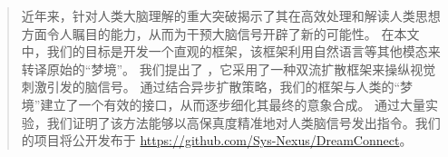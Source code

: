 \begin{abstract}

近年来，针对人类大脑理解的重大突破揭示了其在高效处理和解读人类思想方面令人瞩目的能力，从而为干预大脑信号开辟了新的可能性。
在本文中，我们的目标是开发一个直观的框架，该框架利用自然语言等其他模态来转译原始的“梦境”。
我们提出了 \textbf{\model{}}，它采用了一种双流扩散框架来操纵视觉刺激引发的脑信号。
通过结合异步扩散策略，我们的框架与人类的“梦境”建立了一个有效的接口，从而逐步细化其最终的意象合成。
通过大量实验，我们证明了该方法能够以高保真度精准地对人类脑信号发出指令。我们的项目将公开发布于 \textcolor{blue}{\href{https://github.com/Sys-Nexus/DreamConnect}{https://github.com/Sys-Nexus/DreamConnect}}。

\end{abstract}

